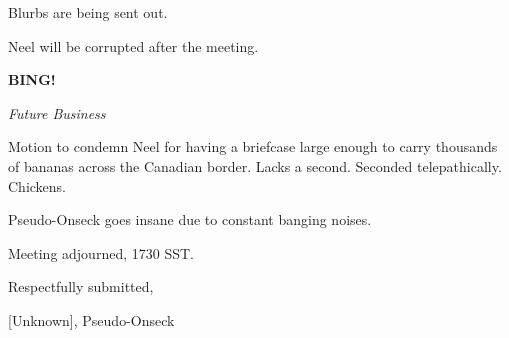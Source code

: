 \documentclass[12pt]{article}
\newcommand{\bing}{{\bf BING!} }
\newcommand{\goto}[1]{\bing \vskip 12pt \centerline{{\em{#1}}}}
\begin{document}
Blurbs are being sent out.

Neel will be corrupted after the meeting.

\goto{Future Business}

Motion to condemn Neel for having a briefcase large enough to carry thousands of bananas across the Canadian border. Lacks a second. Seconded telepathically. Chickens.

Pseudo-Onseck goes insane due to constant banging noises.

\vspace{12pt}

\noindent
Meeting adjourned, 1730 SST.

\vspace{18pt}

\centerline{Respectfully submitted,}
\centerline{[Unknown], Pseudo-Onseck}
\end{document}
